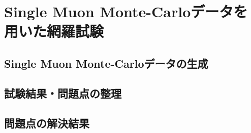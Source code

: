 \section{Single Muon Monte-Carloデータを用いた網羅試験}
\label{sec_SingleMuon}

\subsection{Single Muon Monte-Carloデータの生成}
\label{subsec_SingleMuon_generation}

\subsection{試験結果・問題点の整理}
\label{subsec_SingleMuon_result}

\subsection{問題点の解決結果}


